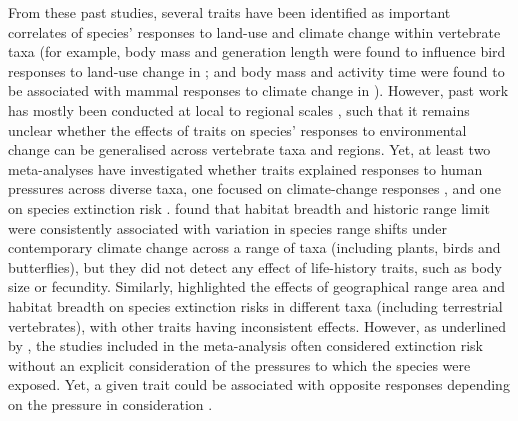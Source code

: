 From these past studies, several traits have been identified as important correlates of species' responses to land-use and climate change within vertebrate taxa (for example, body mass and generation length were found to influence bird responses to land-use change in \citet{Newbold2013}; and body mass and activity time were found to be associated with mammal responses to climate change in \citet{Mccain2014}). However, past work has mostly been conducted at local to regional scales \citep{Hevia2017, Davison2021}, such that it remains unclear whether the effects of traits on species' responses to environmental change can be generalised across vertebrate taxa and regions. Yet, at least two meta-analyses have investigated whether traits explained responses to human pressures across diverse taxa, one focused on climate-change responses \citep{MacLean2017}, and one on species extinction risk \citep{Chichorro2019}. \citet{MacLean2017} found that habitat breadth and historic range limit were consistently associated with variation in species range shifts under contemporary climate change across a range of taxa (including plants, birds and butterflies), but they did not detect any effect of life-history traits, such as body size or fecundity. Similarly, \citet{Chichorro2019} highlighted the effects of geographical range area and habitat breadth on species extinction risks in different taxa (including terrestrial vertebrates), with other traits having inconsistent effects. However, as underlined by \citet{Chichorro2019}, the studies included in the meta-analysis often considered extinction risk without an explicit consideration of the pressures to which the species were exposed. Yet, a given trait could be associated with opposite responses depending on the pressure in consideration \citep{GonzalezSuarez2013}. 

